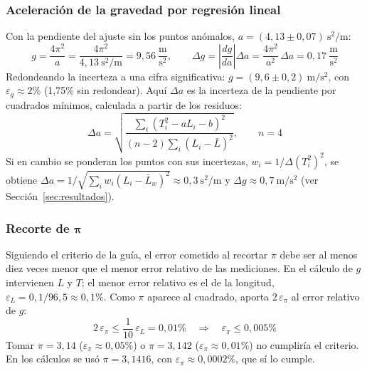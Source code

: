 \documentclass[12pt,a4paper]{article}
\begin{document}
\subsubsection{Aceleración de la gravedad por regresión lineal}
Con la pendiente del ajuste sin los puntos anómalos, $a = (4{,}13 \pm 0{,}07)\ \mathrm{s^2/m}$:
\[
  g = \frac{4\pi^2}{a} = \frac{4\pi^2}{4{,}13\ \mathrm{s^2/m}} = 9{,}56\ \frac{\mathrm{m}}{\mathrm{s^2}},
  \qquad
  \Delta g = \left|\frac{dg}{da}\right| \Delta a = \frac{4\pi^2}{a^2}\,\Delta a
           = 0{,}17\ \frac{\mathrm{m}}{\mathrm{s^2}}
\]
Redondeando la incerteza a una cifra significativa: $g = (9{,}6 \pm 0{,}2)\ \mathrm{m/s^2}$,
con $\varepsilon_g \approx 2\%$ (1,75\% sin redondear). Aquí $\Delta a$ es la incerteza de la pendiente por cuadrados mínimos, calculada a partir de
los residuos:
\[
  \Delta a = \sqrt{\frac{\sum_i \left(T_i^2 - a L_i - b\right)^2}{(n-2)\sum_i (L_i - \bar L)^2}},
  \qquad n = 4
\]
Si en cambio se ponderan los puntos con sus incertezas, $w_i = 1/\Delta(T_i^2)^2$, se obtiene
$\Delta a = 1/\sqrt{\sum_i w_i (L_i - \bar L_w)^2} \approx 0{,}3\ \mathrm{s^2/m}$ y
$\Delta g \approx 0{,}7\ \mathrm{m/s^2}$ (ver Sección~\ref{sec:resultados}).

\subsubsection{Recorte de $\boldsymbol{\pi}$}
Siguiendo el criterio de la guía, el error cometido al recortar $\pi$ debe ser al menos diez
veces menor que el menor error relativo de las mediciones.
En el cálculo de $g$ intervienen $L$ y $T$; el menor error relativo es el de la longitud,
$\varepsilon_L = 0{,}1/96{,}5 \approx 0{,}1\%$. Como $\pi$ aparece al cuadrado, aporta
$2\,\varepsilon_\pi$ al error relativo de $g$:
\[
  2\,\varepsilon_\pi \leq \frac{1}{10}\,\varepsilon_L = 0{,}01\%
  \quad\Rightarrow\quad
  \varepsilon_\pi \leq 0{,}005\%
\]
Tomar $\pi = 3{,}14$ ($\varepsilon_\pi \approx 0{,}05\%$) o $\pi = 3{,}142$
($\varepsilon_\pi \approx 0{,}01\%$) no cumpliría el criterio. En los cálculos se usó
$\pi = 3{,}1416$, con $\varepsilon_\pi \approx 0{,}0002\%$, que sí lo cumple.
\end{document}
